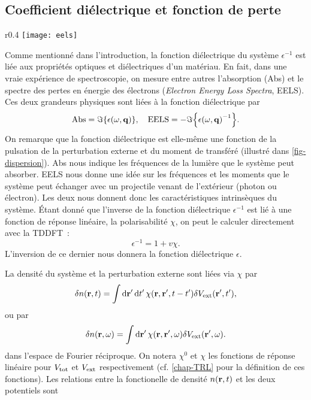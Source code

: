\subsection{Coefficient diélectrique et fonction de perte}
\label{subsec-eels}
\begin{wrapfigure}{r}{0.4\textwidth}
  \centering
  \texttt{[image: eels]}
  \caption{Dispersion des spectres}\label{fig-dispersion}
\end{wrapfigure}
Comme mentionné dans l'introduction,
la fonction diélectrique du système $\epsilon^{-1}$ est liée aux propriétés optiques et diélectriques d'un matériau.
En fait, dans une vraie expérience de spectroscopie,
on mesure entre autres l'absorption (Abs) et le spectre des pertes en énergie des électrons
(\textit{Electron Energy Loss Spectra}, EELS).
Ces deux grandeurs physiques sont liées à la fonction diélectrique par~\cite{Sottile2003}
\begin{equation}
  \label{eqn-EELS}
  \V{Abs} = \imaginary\qty{\epsilon(\omega, \vb{q})},
  \quad
  \V{EELS} = -\imaginary\qty{{\epsilon(\omega, \vb{q})}^{-1}}.
\end{equation}
On remarque que la fonction diélectrique est elle-même une fonction de la pulsation de la perturbation externe et du moment de transféré (illustré dans \cref{fig-dispersion}).
Abs nous indique les fréquences de la lumière que le système peut absorber.
EELS nous donne une idée sur les fréquences et les moments
que le système peut échanger avec un projectile venant de l'extérieur (photon ou électron).
Les deux nous donnent donc les caractéristiques intrinsèques du système.
Étant donné que l'inverse de la fonction diélectrique
$\epsilon^{-1}$ est lié à une fonction de réponse linéaire,
la polarisabilité $\chi$, on peut le calculer directement
avec la TDDFT~\cite{Martin2004, Sottile2003}:
\begin{equation}
  \label{epsilon}
  \epsilon^{-1} = 1+ v\chi.
\end{equation}
L'inversion de ce dernier nous donnera la fonction diélectrique $\epsilon$.

La densité du système et la perturbation externe sont liées via $\chi$ par
\begin{equation}
  \delta n(\vb{r}, t) = \int \dd{\vb{r}'} \dd{t'} \chi(\vb{r}, \vb{r}', t-t')\delta V_{\textnormal{ext}}(\vb{r}', t'),
\end{equation}
ou par
\begin{equation}
  \delta n(\vb{r}, \omega) = \int\dd{\vb{r}'}\chi(\vb{r}, \vb{r}', \omega)\delta V_{\textnormal{ext}}(\vb{r}', \omega).
\end{equation}
dans l'espace de Fourier réciproque.
On notera $\chi^0$ et $\chi$ les fonctions de réponse linéaire pour
$V_{\textnormal{tot}}$ et $V_{\textnormal{ext}}$ respectivement (cf. \cref{chap-TRL} pour la définition de ces fonctions).
Les relations entre la fonctionelle de densité $n(\vb{r}, t)$ et les deux potentiels sont

